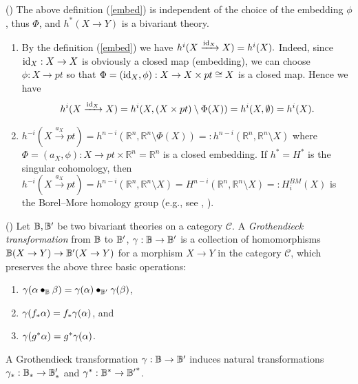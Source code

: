 \documentclass[a4paper]{amsart}
\begin{document}
\begin{thm}(\cite[p.34-p.38]{FM}) The above definition (\ref{embed}) is independent of the choice of the embedding $\phi$, thus $\Phi$, and $h^*(X \to Y)$ is a bivariant theory.
\end{thm}
\begin{rem} 
\begin{enumerate}
\item By the definition (\ref{embed}) we have
$h^i(X \xrightarrow {\operatorname{id}_X} X) = h^i(X).$
Indeed, since $\operatorname{id}_X: X \to X$ is obviously a closed map (embedding), we can choose $\phi:X \to pt$ so that
$\Phi=(\operatorname{id}_X, \phi):X \to X \times pt \cong X$ is a closed map. Hence 
we have 
$$h^i(X \xrightarrow {\operatorname{id}_X} X)= h^i(X, (X \times pt) \setminus \Phi(X))=h^i(X, \emptyset)=h^i(X).$$
\item $h^{-i}(X \xrightarrow {a_X} pt) = h^{n-i}(\mathbb R^n, \mathbb R^n \setminus \Phi(X))=:h^{n-i}(\mathbb R^n, \mathbb R^n \setminus X)$ where $\Phi=(a_X, \phi):X \to pt \times \mathbb R^n =\mathbb R^n$ is a closed embedding. If $h^*=H^*$ is the singular cohomology, then $h^{-i}(X \xrightarrow {a_X} pt) =h^{n-i}(\mathbb R^n, \mathbb R^n \setminus X) =H^{n-i}(\mathbb R^n, \mathbb R^n \setminus X) =:H^{BM}_i(X)$ is the Borel--More homology group (e.g., see \cite{Ful}, \cite[B.1]{PS}).
\end{enumerate}
\end{rem}
\begin{defn}
(\cite[\S 2.7 Grothendieck transformation]{FM}) \label{groth}
Let $\mathbb B, \mathbb B'$ be two bivariant theories on a category $\mathscr C$. 
A {\it Grothendieck transformation} from $\mathbb B$ to $\mathbb B'$, $\gamma : \mathbb B \to \mathbb B'$
is a collection of homomorphisms
$\mathbb B(X \to Y) \to \mathbb B'(X \to Y)$
for a morphism $X \to Y$ in the category $\mathscr C$, which preserves the above three basic operations: 
\begin{enumerate}
\item $\gamma (\alpha \bullet_{\mathbb B} \beta) = \gamma (\alpha) \bullet _{\mathbb B'} \gamma (\beta)$, 
\item $\gamma(f_{*}\alpha) = f_*\gamma (\alpha)$, and 
\item $\gamma (g^* \alpha) = g^* \gamma (\alpha)$. 
\end{enumerate}
\end{defn}

A Grothendieck transformation $\gamma: \mathbb B \to \mathbb B'$ induces natural transformations $\gamma_*: \mathbb B_* \to \mathbb B_*'$ and $\gamma^*: \mathbb B^* \to {\mathbb B'}^*$.
 
\end{document}

